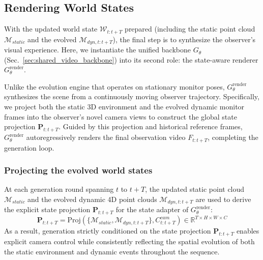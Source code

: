 \subsection{Rendering World States}
\vspace{-0.5mm}
\label{sec:observer_rendering}
With the updated world state $\mathcal{W}_{t:t+T}$ prepared (including the static point cloud $\mathcal{M}_{static}$ and the evolved $\mathcal{M}_{dyn, t:t+T}$), the final step is to synthesize the observer's visual experience. Here, we instantiate the unified backbone $G_{\theta}$ (Sec.~\ref{sec:shared_video_backbone}) into its second role: the state-aware renderer $G_{\theta}^\text{render}$. 

Unlike the evolution engine that operates on stationary monitor poses, $G_{\theta}^\text{render}$ synthesizes the scene from a continuously moving observer trajectory. Specifically, we project both the static 3D environment and the evolved dynamic monitor frames into the observer's novel camera views to construct the global state projection $\mathbf{P}_{t:t+T}$. Guided by this projection and historical reference frames, $G_{\theta}^\text{render}$ autoregressively renders the final observation video $F_{t:t+T}$, completing the generation loop.
\vspace{-3mm}
\subsubsection{Projecting the evolved world states}
At each generation round spanning $t$ to $t+T$, the updated static point cloud $\mathcal{M}_{static}$ and the evolved dynamic 4D point clouds $\mathcal{M}_{dyn, t:t+T}$ are used to derive the explicit state projection $\textbf{P}_{t:t+T}$ for the state adapter of $G_{\theta}^{\text{render}}$:
\vspace{-1mm}
\begin{equation}
    \mathbf{P}_{t:t+T} = \text{Proj}(\{\mathcal{M}_{static}, \mathcal{M}_{dyn, t:t+T}\}, C_{t:t+T}^{cam}) \in \mathbb{R}^{T \times H \times W \times C}
\end{equation}
As a result, generation strictly conditioned on the state projection $\mathbf{P}_{t:t+T}$ enables explicit camera control while consistently reflecting the spatial evolution of both the static environment and dynamic events throughout the sequence.

